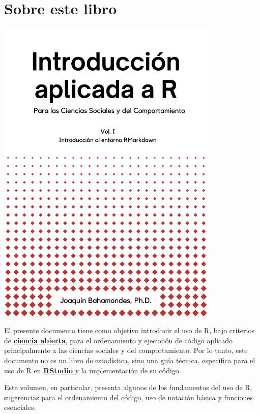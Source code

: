 \documentclass[
]{book}
\author{}
\date{\vspace{-2.5em}}
\begin{document}
{
\setcounter{tocdepth}{1}
\tableofcontents
}
\hypertarget{sobre-este-libro}{%
\chapter*{Sobre este libro}\label{sobre-este-libro}}

\includegraphics[width=4.16667in,height=\textheight]{_bookdown_files/images/1.png}

El presente documento tiene como objetivo introducir el uso de R, bajo criterios de \href{https://es.wikipedia.org/wiki/Ciencia_abierta}{\textbf{ciencia abierta}}, para el ordenamiento y ejecución de código aplicado principalmente a las ciencias sociales y del comportamiento. Por lo tanto, este documento no es un libro de estadística, sino una guía técnica, específica para el uso de R en \href{https://posit.co/download/rstudio-desktop/}{\textbf{RStudio}} y la implementación de su código.

Este volumen, en particular, presenta algunos de los fundamentos del uso de R, sugerencias para el ordenamiento del código, uso de notación básica y funciones esenciales.
\end{document}

